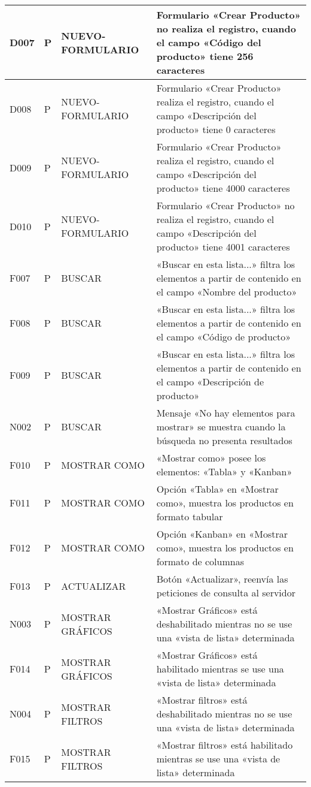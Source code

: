 \begin{landscape}
\begin{longtable}[htb]{|l|l|p{5.0cm}|p{13.0cm}|}
D007 & P & NUEVO-FORMULARIO & Formulario «Crear Producto» no realiza el registro, cuando el campo «Código del producto» tiene 256 caracteres \\ \hline
D008 & P & NUEVO-FORMULARIO & Formulario «Crear Producto» realiza el registro, cuando el campo «Descripción del producto» tiene 0 caracteres \\ \hline
D009 & P & NUEVO-FORMULARIO & Formulario «Crear Producto» realiza el registro, cuando el campo «Descripción del producto» tiene 4000 caracteres \\ \hline
D010 & P & NUEVO-FORMULARIO & Formulario «Crear Producto» no realiza el registro, cuando el campo «Descripción del producto» tiene 4001 caracteres \\ \hline
F007 & P & BUSCAR & «Buscar en esta lista...» filtra los elementos a partir de contenido en el campo «Nombre del producto» \\ \hline
F008 & P & BUSCAR & «Buscar en esta lista...» filtra los elementos a partir de contenido en el campo «Código de producto» \\ \hline
F009 & P & BUSCAR & «Buscar en esta lista...» filtra los elementos a partir de contenido en el campo «Descripción de producto» \\ \hline
N002 & P & BUSCAR & Mensaje «No hay elementos para mostrar» se muestra cuando la búsqueda no presenta resultados \\ \hline
F010 & P & MOSTRAR COMO & «Mostrar como» posee los elementos: «Tabla» y «Kanban» \\ \hline
F011 & P & MOSTRAR COMO & Opción «Tabla» en «Mostrar como», muestra los productos en formato tabular \\ \hline
F012 & P & MOSTRAR COMO & Opción «Kanban» en «Mostrar como», muestra los productos en formato de columnas \\ \hline
F013 & P & ACTUALIZAR & Botón «Actualizar», reenvía las peticiones de consulta al servidor \\ \hline
N003 & P & MOSTRAR GRÁFICOS & «Mostrar Gráficos» está deshabilitado mientras no se use una «vista de lista» determinada \\ \hline
F014 & P & MOSTRAR GRÁFICOS & «Mostrar Gráficos» está habilitado mientras se use una «vista de lista» determinada \\ \hline
N004 & P & MOSTRAR FILTROS & «Mostrar filtros» está deshabilitado mientras no se use una «vista de lista» determinada \\ \hline
F015 & P & MOSTRAR FILTROS & «Mostrar filtros» está habilitado mientras se use una «vista de lista» determinada \\ \hline

\end{longtable}
\end{landscape}
